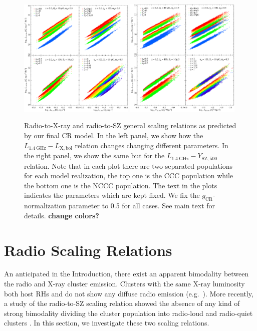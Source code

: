 \documentclass[traditabstract]{aa}
\newcommand{\rmn}{\mathrm}
\begin{document}
\begin{figure}[t]
\centering
\includegraphics[width=0.49\textwidth]{figures/PL_relation_testing_gimp.eps}
\includegraphics[width=0.49\textwidth]{figures/PSZ_relation_testing_gimp.eps}
\caption{Radio-to-X-ray and radio-to-SZ general scaling relations as predicted by our final CR model. In the left panel, we show how the $L_{1.4~\rmn{GHz}}-L_{\rmn{X,bol}}$ relation changes changing different parameters. In the right panel, we show the same but for the $L_{1.4~\rmn{GHz}}-Y_{\rmn{SZ},500}$ relation. Note that in each plot there are two separated populations for each model realization, the top one is the CCC population while the bottom one is the NCCC population. The text in the plots indicates the parameters which are kept fixed. We fix the $g_{\rmn{CR}}$-normalization parameter to 0.5 for all cases. See main text for details. {\bf change colors?}}
\label{fig:SR}
\end{figure}


\section{Radio Scaling Relations}
\label{sec:4}
An anticipated in the Introduction, there exist an apparent bimodality between the radio and X-ray cluster emission. Clusters with the same X-ray luminosity both host RHs and do not show any diffuse radio emission (e.g.~\citealp{2009A&A...507..661B,2011A&A...527A..99E}). More recently, a study of the radio-to-SZ scaling relation showed the absence of any kind of strong bimodality dividing the cluster population into radio-loud and radio-quiet clusters \citep{2012MNRAS.421L.112B}. In this section, we investigate these two scaling relations.
\end{document}
